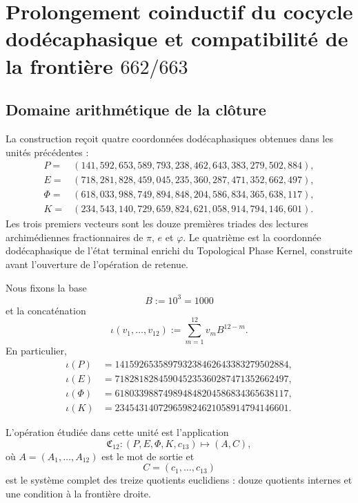 
\section{Prolongement coinductif du cocycle dodécaphasique et compatibilité de la frontière \texorpdfstring{\(662/663\)}{662/663}}
\label{p3-83-c25-s5:chap:acarreo-alpha-frontera-662-663}

\subsection{Domaine arithmétique de la clôture}

La construction reçoit quatre coordonnées dodécaphasiques obtenues dans les
unités précédentes :
\[
\begin{aligned}
 P={}&(141,592,653,589,793,238,462,643,383,279,502,884),\\
 E={}&(718,281,828,459,045,235,360,287,471,352,662,497),\\
 \Phi={}&(618,033,988,749,894,848,204,586,834,365,638,117),\\
 K={}&(234,543,140,729,659,824,621,058,914,794,146,601).
\end{aligned}
\]
Les trois premiers vecteurs sont les douze premières triades des lectures
archimédiennes fractionnaires de \(\pi\), \(e\) et \(\varphi\). Le quatrième est
la coordonnée dodécaphasique de l’état terminal enrichi du Topological
Phase Kernel, construite avant l’ouverture de l’opération de retenue.

Nous fixons la base
\[
 B:=10^3=1000
\]
et la concaténation
\begin{equation}
 \iota(v_1,\ldots,v_{12})
 :=\sum_{m=1}^{12}v_mB^{12-m}.
 \label{p3-83-c25-s5:eq:concatenacion-base-mil-alpha}
\end{equation}
En particulier,
\[
\begin{aligned}
 \iota(P)&=141592653589793238462643383279502884,\\
 \iota(E)&=718281828459045235360287471352662497,\\
 \iota(\Phi)&=618033988749894848204586834365638117,\\
 \iota(K)&=234543140729659824621058914794146601.
\end{aligned}
\]

L’opération étudiée dans cette unité est l’application
\begin{equation}
 \mathfrak C_{12}:
 (P,E,\Phi,K,c_{13})
 \longmapsto(A,C),
 \label{p3-83-c25-s5:eq:mapa-cierre-dodecafasico-alpha}
\end{equation}
où \(A=(A_1,\ldots,A_{12})\) est le mot de sortie et
\[
 C=(c_1,\ldots,c_{13})
\]
est le système complet des treize quotients euclidiens : douze quotients
internes et une condition à la frontière droite.

